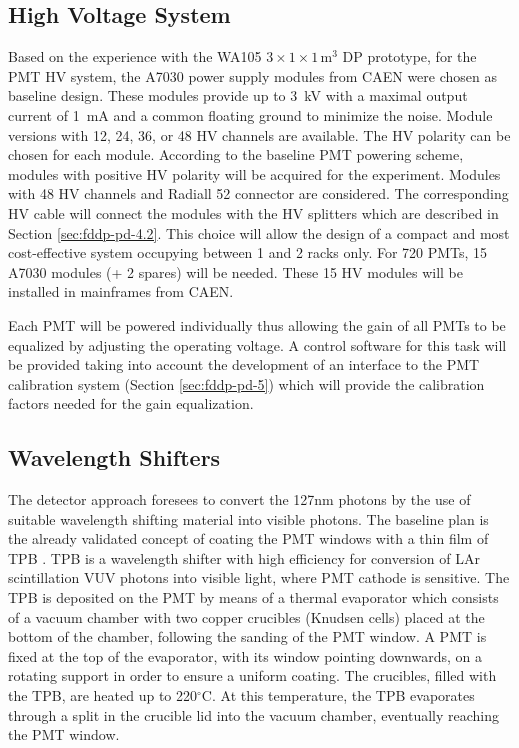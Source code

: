 \subsection{High Voltage System}
\label{sec:fddp-pd-2.3}

Based on the experience with the WA105 $3\times1\times1$\,m$^3$ DP prototype, for the PMT HV system, the A7030 power supply modules from CAEN \cite{caen-a7030} were chosen as baseline design. These modules provide up to \SI{3}{kV} with a maximal output current of \SI{1}{mA} and a common floating ground to minimize the noise. Module versions with \num{12}, \num{24}, \num{36}, or \num{48} HV channels are available. The HV polarity can be chosen for each module. According to the baseline PMT powering scheme, modules with positive HV polarity will be acquired for the experiment. Modules with \num{48} HV channels and Radiall \num{52} connector are considered. The corresponding HV cable will connect the modules with the HV splitters which are described in Section \ref{sec:fddp-pd-4.2}. This choice will allow the design of a compact and most cost-effective system occupying between \num{1} and \num{2} racks only. For \num{720} PMTs, \num{15} A7030 modules (+ \num{2} spares) will be needed. These \num{15} HV modules will be installed in mainframes from CAEN.

Each PMT will be powered individually thus allowing the gain of all PMTs to be equalized by adjusting the operating voltage. A control software for this task will be provided taking into account the development of an interface to the PMT calibration system (Section \ref{sec:fddp-pd-5}) which will provide the calibration factors needed for the gain equalization.

\subsection{Wavelength Shifters}
\label{sec:fddp-pd-2.4}

The detector approach foresees to convert the \si{127}{nm} photons by the use of suitable wavelength shifting material into visible photons. The baseline plan is the already validated concept of coating the PMT windows with a thin film of TPB \cite{tpb}. TPB is a wavelength shifter with high efficiency for conversion of LAr scintillation VUV photons into visible light, where PMT cathode is sensitive. The TPB is deposited on the PMT by means of a thermal evaporator which consists of a vacuum chamber with two copper crucibles (Knudsen cells) placed at the bottom of the chamber, following the sanding of the PMT window. A PMT is fixed at the top of the evaporator, with its window pointing downwards, on a rotating support in order to ensure a uniform coating. The crucibles, filled with the TPB, are heated up to \si{220}{$^\circ$C}. At this temperature, the TPB evaporates through a split in the crucible lid into the vacuum chamber, eventually reaching the PMT window.

